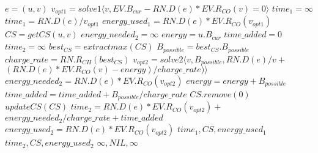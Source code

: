 \begin{algorithmic}
	\State $e = (u, v)$
	\State $v_{opt1} = solve1\langle v, EV.B_{cur}-RN.D(e)*EV.R_{CO}(v) = 0\rangle$
		\State $time_1 = \infty$
	\Else
		\State $time_1 = RN.D(e) / v_{opt1}$
		\State $energy\_used_{1} = RN.D(e)*EV.R_{CO}(v_{opt1})$
	\EndIf
		\State $CS = getCS(u, v)$ 
		\State $energy\_needed_{2} = \infty$
		\State $energy = u.B_{cur}$
		\State $time\_added = 0$
		\State $time_2 = \infty$
		\State $best_{CS} = extractmax(CS)$
		\State $B_{possible} = best_{CS}.B_{possible}$
		\State $charge\_rate = RN.R_{CH}(best_{CS})$
		\State $v_{opt2} = solve2 \langle v, B_{possible},  RN.D(e)/v + $
			\State $(RN.D(e)*EV.R_{CO}(v)-energy)/charge\_rate) \rangle$
		\State $energy\_needed_{2} = RN.D(e)*EV.R_{CO}(v_{opt2})$
		\State $energy = energy + B_{possible}$
			\State $time\_added = time\_added + B_{possible}/charge\_rate$
			\State $CS.remove(0)$
			\State $updateCS(CS)$
		\EndIf	
	\EndWhile
		\State $time_2 = RN.D(e)*EV.R_{CO}(v_{opt2}) + $
		\State $energy\_needed_{2}/charge\_rate + time\_added$
		\State $energy\_used_2 = RN.D(e)*EV.R_{CO}(v_{opt2})$
	\EndIf
		\State \Return $time_1, CS, energy\_used_1$
		\State \Return $time_2, CS, energy\_used_2$
	\Else
		\State \Return $\infty, NIL, \infty$
	\EndIf

\EndFunction
\end{algorithmic}\label{alg:fastest_path}
